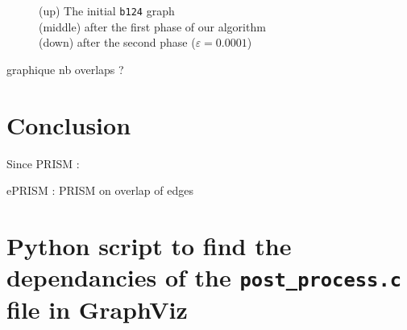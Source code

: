 \documentclass[12pt]{report}
\begin{document}
\begin{figure}[h]
	\center
  \setlength\fboxsep{5pt}
  \setlength\fboxrule{0.5pt}
  
  
  
  \caption{(up) The initial \texttt{b124} graph \\ (middle) after the first phase of our algorithm \\ (down) after the second phase ($\varepsilon = 0.0001$)}
  \label{b124}
\end{figure}

graphique nb overlaps ?

\chapter{Conclusion}

Since PRISM :

ePRISM : PRISM on overlap of edges \cite{Hu09}

\appendix
\chapter{Python script to find the dependancies of the \texttt{post\_process.c} file in GraphViz}
\end{document}
